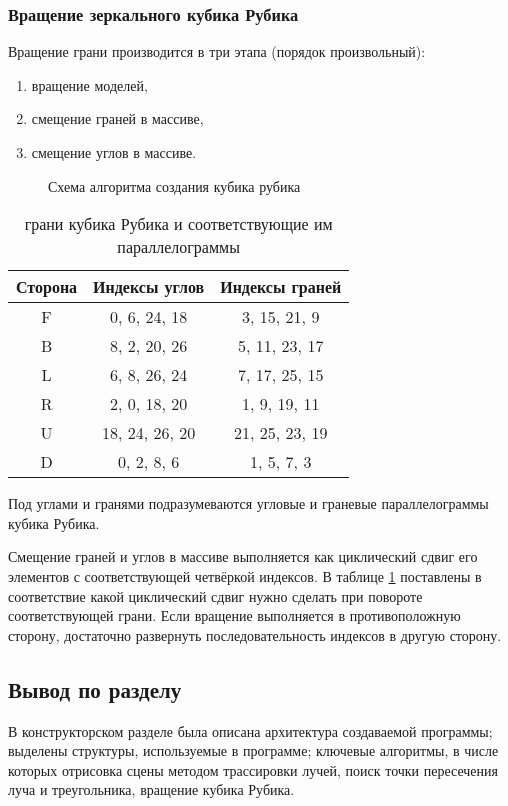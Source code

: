 \subsubsection{Вращение зеркального кубика Рубика}

Вращение грани производится в три этапа (порядок произвольный):
\begin{enumerate}
	\item вращение моделей,
	\item смещение граней в массиве,
	\item смещение углов в массиве.
\end{enumerate}

\begin{figure}[!ht]
	\caption{Схема алгоритма создания кубика рубика}
	\label{fig:rubicks_create}
\end{figure}
\begin{table}[!ht]
	\centering
	\caption{грани кубика Рубика и соответствующие им параллелограммы}
	\label{tabular:cube_indexes}
	\begin{tabular}{|c|c|c|}
		\hline
		Сторона & Индексы углов & Индексы граней \\
		\hline
		\hline
		F & 0, 6, 24, 18	& 3, 15, 21, 9		\\ \hline
		B & 8, 2, 20, 26	& 5, 11, 23, 17		\\ \hline
		L & 6, 8, 26, 24	& 7, 17, 25, 15		\\ \hline
		R & 2, 0, 18, 20	& 1, 9, 19, 11		\\ \hline
		U & 18, 24, 26, 20	& 21, 25, 23, 19	\\ \hline
		D & 0, 2, 8, 6		& 1, 5, 7, 3		\\ \hline
	\end{tabular}
\end{table}

Под углами и гранями подразумеваются угловые и граневые параллелограммы кубика Рубика.

Смещение граней и углов в массиве выполняется как циклический сдвиг его элементов с соответствующей четвёркой индексов. В таблице \ref{tabular:cube_indexes} поставлены в соответствие какой циклический сдвиг нужно сделать при повороте соответствующей грани. Если вращение выполняется в противоположную сторону, достаточно развернуть последовательность индексов в другую сторону.

\subsection{Вывод по разделу}
В конструкторском разделе была описана архитектура создаваемой программы;
выделены структуры, используемые в программе;
ключевые алгоритмы, в числе которых отрисовка сцены методом трассировки лучей,
поиск точки пересечения луча и треугольника, вращение кубика Рубика.

